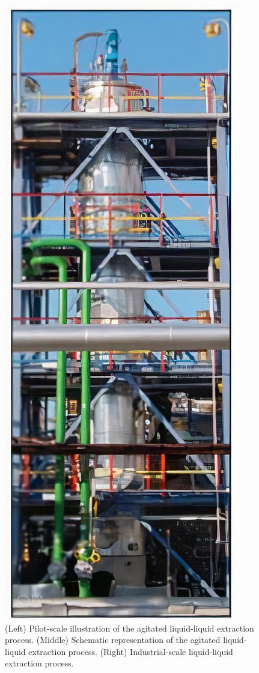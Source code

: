 \begin{figure}[h!]
    \includegraphics[height=0.3\textheight]{image/process_LE_auto_x4.jpg}

    \caption{
        (Left)   Pilot-scale illustration of the agitated liquid-liquid extraction process.
        (Middle) Schematic representation of the agitated liquid-liquid extraction process.
        (Right)  Industrial-scale liquid-liquid extraction process.
    }
    \label{fig:liq-liq}
\end{figure}



